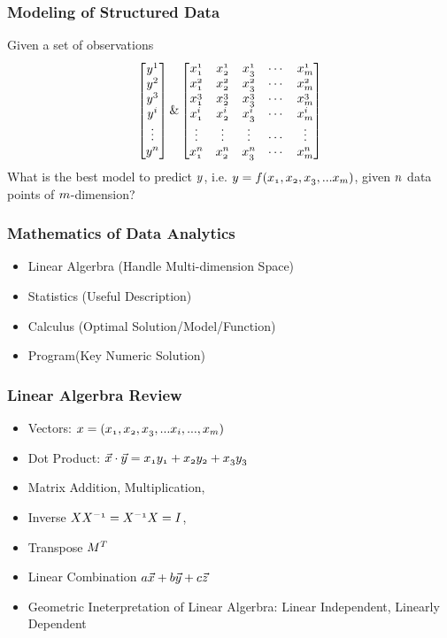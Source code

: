 \documentclass[notheorems, aspectratio=54]{beamer}
\begin{document}
\begin{frame}
\frametitle{Modeling of Structured Data}
Given a set of observations
\[ \begin{bmatrix}  \mathnormal{y}^1 \\ \mathnormal{y}^2\\\mathnormal{y}^3\\\mathnormal{y^i} \\ \vdots \\\mathnormal{y^n} \end{bmatrix}
\&
\begin{bmatrix}
   \mathnormal{x^1_1} &\mathnormal{x^1_2}  &\mathnormal{x^1_3} & \cdots &\mathnormal{x^1_m}\\
   \mathnormal{x^2_1} &\mathnormal{x^2_2} &\mathnormal{x^2_3} & \cdots &\mathnormal{x^2_m}\\
   \mathnormal{x^3_1} &\mathnormal{x^3_2} &\mathnormal{x^3_3} & \cdots &\mathnormal{x^3_m}\\
   \mathnormal{x^i_1} &\mathnormal{x^i_2} &\mathnormal{x^i_3} & \cdots &\mathnormal{x^i_m}\\
   \vdots &\vdots &\vdots & \cdots &\vdots\\
   \mathnormal{x^n_1} &\mathnormal{x^n_2} &\mathnormal{x^n_3} &\cdots &\mathnormal{x^n_m}
  \end{bmatrix}
\]
What is the best model to predict $\mathnormal{y}$, i.e. $\mathnormal{y}=\mathnormal{f(x_1, x_2, x_3,  ... x_m)}$, given $\mathnormal{n}$ data points of $\mathnormal{m}$-dimension?
\end{frame}


\begin{frame}
\frametitle{Mathematics of Data Analytics}
\begin{itemize}
\item Linear Algerbra (Handle Multi-dimension Space)
\item Statistics (Useful Description)
\item Calculus (Optimal Solution/Model/Function)
\item Program(Key Numeric Solution)
\end{itemize}
\end{frame}

\begin{frame}
\frametitle{Linear Algerbra Review}
\begin{itemize}
\item Vectors: $\mathnormal{x=(x_1, x_2, x_3,...x_i, ..., x_m)}$
\item Dot Product: $\mathnormal{\vec{x}\cdot\vec{y}=x_1 y_1+x_2 y_2+x_3 y_3}$
\item Matrix Addition, Multiplication, 
\item Inverse $\mathnormal{{X}X^{-1}=X^{-1}X=I}$, 
\item Transpose $\mathnormal{M^{T}}$
\item Linear Combination $\mathnormal{a\vec{x}+b\vec{y}+c\vec{z}}$
\item Geometric Ineterpretation of Linear Algerbra: Linear Independent, Linearly Dependent
\end{itemize}
\end{frame}
\end{document}
